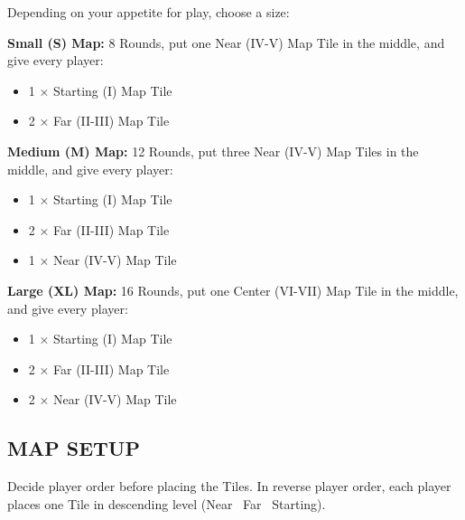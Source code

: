 \begin{multicols*}{2}
Depending on your appetite for play, choose a size:

\textbf{Small (S) Map:} 8 Rounds, put one Near (IV-V) Map Tile in the middle, and give every player:
\begin{itemize}
  \item 1 × Starting (I) Map Tile
  \item 2 × Far (II-III) Map Tile
\end{itemize}

\textbf{Medium (M) Map:} 12 Rounds, put three Near (IV-V) Map Tiles in the middle, and give every player:
\begin{itemize}
  \item 1 × Starting (I) Map Tile
  \item 2 × Far (II-III) Map Tile
  \item 1 × Near (IV-V) Map Tile
\end{itemize}

\textbf{Large (XL) Map:} 16 Rounds, put one Center (VI-VII) Map Tile in the middle, and give every player:
\begin{itemize}
  \item 1 × Starting (I) Map Tile
  \item 2 × Far (II-III) Map Tile
  \item 2 × Near (IV-V) Map Tile
\end{itemize}


\end{multicols*}


\pagebreak

\subsection*{\MakeUppercase{Map Setup}}


Decide player order before placing the Tiles.
In reverse player order, each player places one Tile in descending level (Near \rightarrow\ Far \rightarrow\ Starting).  %

